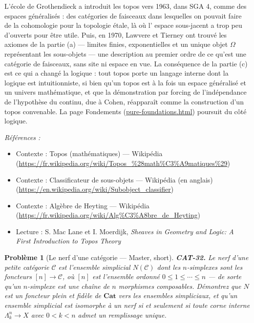 \documentclass[11pt]{article}
\newtheorem{problem}{Problème}
\newenvironment{refs}{\par\small\noindent\emph{Références :}\begin{itemize}\setlength\itemsep{0pt}}{\end{itemize}\normalsize}
\begin{document}
\noindent L'école de Grothendieck a introduit les topos vers 1963, dans SGA 4, comme des
espaces généralisés : des catégories de faisceaux dans lesquelles on pouvait faire de la
cohomologie pour la topologie étale, là où l'\og{} espace \fg{} sous-jacent a trop peu d'ouverts pour être
utile. Puis, en 1970, Lawvere et Tierney ont trouvé les axiomes de la partie (a) --- limites finies,
exponentielles et un unique objet $ \Omega $ représentant les sous-objets --- une description au
premier ordre de ce qu'est une catégorie de faisceaux, sans site ni espace en vue. La conséquence
de la partie (c) est ce qui a changé la logique : tout topos porte un langage interne dont la
logique est intuitionniste, si bien qu'un topos est à la fois un espace généralisé et un univers
mathématique, et que la démonstration par forcing de l'indépendance de l'hypothèse du continu,
due à Cohen, réapparaît comme la construction d'un topos convenable. La page
Fondements (\url{pure-foundations.html}) poursuit du côté logique.

\begin{refs}
\item Contexte : Topos (mathématiques) --- Wikipédia (\url{https://fr.wikipedia.org/wiki/Topos_%28math%C3%A9matiques%29})
\item Contexte : Classificateur de sous-objets --- Wikipédia (en anglais) (\url{https://en.wikipedia.org/wiki/Subobject_classifier})
\item Contexte : Algèbre de Heyting --- Wikipédia (\url{https://fr.wikipedia.org/wiki/Alg%C3%A8bre_de_Heyting})
\item Lecture : S. Mac Lane et I. Moerdijk, \textit{Sheaves in Geometry and Logic: A First Introduction to Topos Theory}
\end{refs}

\bigskip

\begin{problem}[{Le nerf d'une catégorie --- Master, short}]
\textbf{CAT-32.} Le \textit{nerf} d'une petite catégorie $ \mathcal{C} $
est l'ensemble simplicial $ N(\mathcal{C}) $ dont les $ n $-simplexes sont les foncteurs
$ [n] \to \mathcal{C} $, où $ [n] $ est l'ensemble ordonné $ 0 \le 1 \le \cdots \le n $ --- de
sorte qu'un $ n $-simplexe est une chaîne de $ n $ morphismes composables. Démontrez que
$ N $ est un foncteur plein et fidèle de $ \mathbf{Cat} $ vers les ensembles simpliciaux, et
qu'un ensemble simplicial est isomorphe à un nerf si et seulement si toute corne interne
$ \Lambda^{n}_{k} \to X $ avec $ 0 < k < n $ admet un remplissage \textit{unique}.
\end{problem}
\end{document}
